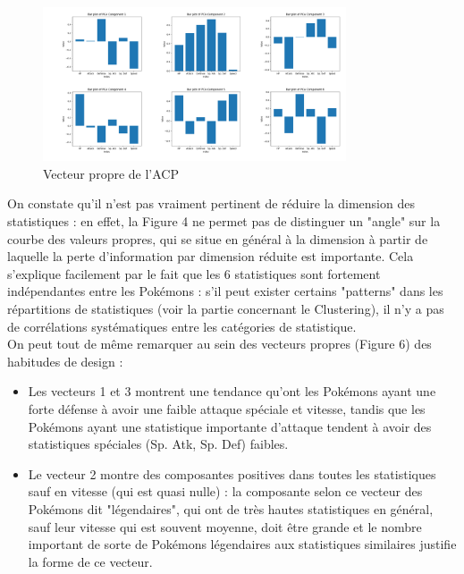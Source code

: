 \documentclass[a4paper,12pt]{article}
\begin{document}
\begin{figure}[htbp]
    \includegraphics[width=0.8\textwidth]{Image/eigen_vector_PCA.png}
    \caption{Vecteur propre de l'ACP}
\end{figure}

On constate qu'il n'est pas vraiment pertinent de réduire la dimension des
statistiques : en effet, la Figure 4 ne permet pas de distinguer un "angle" sur
la courbe des valeurs propres, qui se situe en général à la dimension à partir
de laquelle la perte d'information par dimension réduite est importante. Cela
s'explique facilement par le fait que les 6 statistiques sont fortement
indépendantes entre les Pokémons : s'il peut exister certains "patterns" dans
les répartitions de statistiques (voir la partie concernant le Clustering), il
n'y a pas de corrélations systématiques entre les catégories de statistique. \\
On peut tout de même remarquer au sein des vecteurs propres (Figure 6) des
habitudes de design :
\begin{itemize}
    \item Les vecteurs 1 et 3 montrent une tendance qu'ont les Pokémons ayant
    une forte défense à avoir une faible attaque spéciale et vitesse, tandis que
    les Pokémons ayant une statistique importante d'attaque tendent à avoir des
    statistiques spéciales (Sp. Atk, Sp. Def) faibles.
    \item Le vecteur 2 montre des composantes positives dans toutes les
    statistiques sauf en vitesse (qui est quasi nulle) : la composante selon ce
    vecteur des Pokémons dit "légendaires", qui ont de très hautes statistiques
    en général, sauf leur vitesse qui est souvent moyenne, doit être grande et
    le nombre important de sorte de Pokémons légendaires aux statistiques
    similaires justifie la forme de ce vecteur.
\end{itemize}
\end{document}
